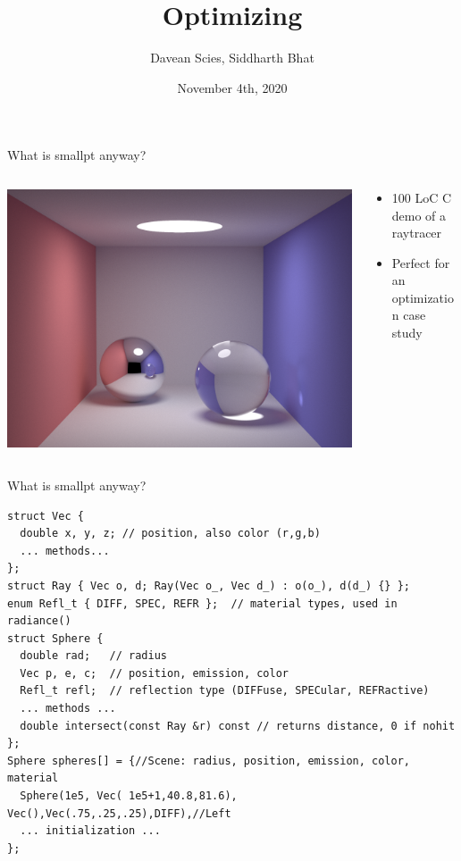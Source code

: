 \documentclass[8pt]{beamer}
\author{Davean Scies, Siddharth Bhat}
\date{November 4th, 2020}
\institute{Haskell Exchange}
\title{Optimizing \smallpt}
\begin{document}
\maketitle

\begin{frame}[fragile]{What is smallpt anyway?}
\pause
\begin{columns}
\begin{column}{0.48\textwidth}
\includegraphics[height=0.8\textwidth]{./smallpt-render.png}
\end{column}
\begin{column}{0.48\textwidth}
\pause
\begin{itemize}
\item 100 LoC C demo of a raytracer \pause
\item Perfect for an optimization case study
\end{itemize}
\end{column}
\end{columns}
\end{frame}


\begin{frame}[fragile]{What is smallpt anyway?}
\begin{verbatim}
struct Vec {      
  double x, y, z; // position, also color (r,g,b) 
  ... methods...
}; 
struct Ray { Vec o, d; Ray(Vec o_, Vec d_) : o(o_), d(d_) {} }; 
enum Refl_t { DIFF, SPEC, REFR };  // material types, used in radiance() 
struct Sphere { 
  double rad;   // radius 
  Vec p, e, c;  // position, emission, color 
  Refl_t refl;  // reflection type (DIFFuse, SPECular, REFRactive) 
  ... methods ...
  double intersect(const Ray &r) const // returns distance, 0 if nohit 
}; 
Sphere spheres[] = {//Scene: radius, position, emission, color, material 
  Sphere(1e5, Vec( 1e5+1,40.8,81.6), Vec(),Vec(.75,.25,.25),DIFF),//Left 
  ... initialization ...
}; 
\end{verbatim}
\end{frame}
\end{document}

